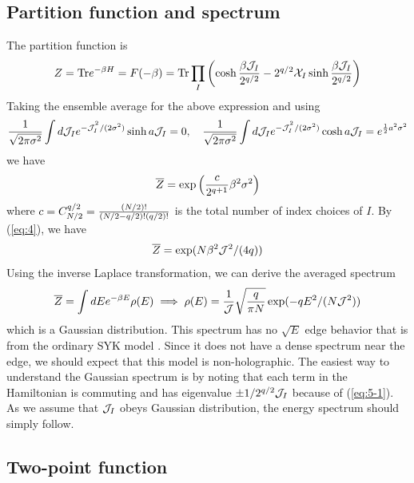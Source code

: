 \documentclass[11pt]{article}
\renewcommand{\>}{\rangle}
\newcommand{\<}{\langle}
\begin{document}
\subsection{Partition function and spectrum}

The partition function is
\begin{equation}
Z=\text{Tr} e^{-\beta H}=F(-\beta)=\text{Tr}\prod_{I}\left(\cosh\frac{\beta\mathcal{J}_{I}}{2^{q/2}}-2^{q/2}\mathcal{X}_{I}\sinh\frac{\beta\mathcal{J}_{I}}{2^{q/2}}\right)
\end{equation}
Taking the ensemble average for the above expression and using
\begin{equation}
\frac{1}{\sqrt{2\pi\sigma^{2}}}\int d\mathcal{J}_{I}e^{-\mathcal{J}_{I}^{^{2}}/(2\sigma^{2})}\sinh a\mathcal{J}_{I}=0,\quad\frac{1}{\sqrt{2\pi\sigma^{2}}}\int d\mathcal{J}_{I}e^{-\mathcal{J}_{I}^{^{2}}/(2\sigma^{2})}\cosh a\mathcal{J}_{I}=e^{\frac{1}{2}a^{2}\sigma^{2}}\label{eq:14}
\end{equation}
we have
\begin{equation}
\overline{Z}=\exp\left(\frac{c}{2^{q+1}}\beta^{2}\sigma^{2}\right)
\end{equation}
where $c=C_{N/2}^{q/2}=\frac{(N/2)!}{(N/2-q/2)!(q/2)!}$ is the total
number of index choices of $I$. By (\ref{eq:4}), we have
\begin{equation}
\overline{Z}=\exp(N\beta^{2}\mathcal{J}^{2}/(4q))\label{eq:14-1}
\end{equation}
Using the inverse Laplace transformation, we can derive the averaged
spectrum
\begin{equation}
\overline{Z}=\int dEe^{-\beta E}\rho(E)\implies\rho(E)=\frac{1}{\mathcal{J}}\sqrt{\frac{q}{\pi N}}\exp(-qE^{2}/(N\mathcal{J}^{2}))
\end{equation}
which is a Gaussian distribution. This spectrum has no $\sqrt{E}$
edge behavior that is from the ordinary SYK model \cite{Garcia-Garcia:2016mno, Maldacena:2016hyu}. Since it does not have
a dense spectrum near the edge, we should expect that this model is
non-holographic. The easiest way to understand the Gaussian spectrum
is by noting that each term in the Hamiltonian is commuting and has
eigenvalue $\pm1/2^{q/2}\mathcal{J}_{I}$ because of (\ref{eq:5-1}). As we
assume that $\mathcal{J}_{I}$ obeys Gaussian distribution, the energy spectrum
should simply follow.

\subsection{Two-point function}
\end{document}
